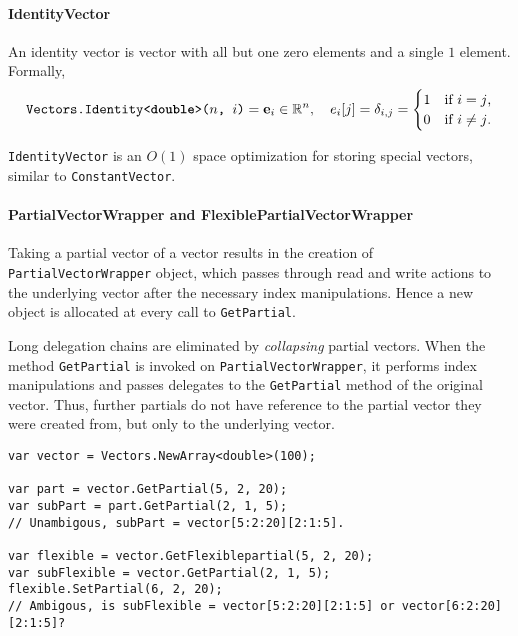 \paragraph{IdentityVector}

An identity vector is vector with all but one zero elements and a
single $1$ element. Formally,
\begin{equation}
  \texttt{Vectors.Identity<\textbf{double}>($n$, $i$)} = \bm{\mathrm{e}}_i \in
  \mathbb{R}^n, \quad e_i[j] = \delta_{i, j} = \begin{cases}
    1 & \text{if $i = j$,} \\
    0 & \text{if $i \ne j$.}
  \end{cases}
\end{equation}

\texttt{IdentityVector} is an $O(1)$ space optimization for storing
special vectors, similar to \texttt{ConstantVector}.

\paragraph{PartialVectorWrapper and FlexiblePartialVectorWrapper}

Taking a partial vector of a vector results in the creation of
\texttt{PartialVectorWrapper} object, which passes through read and
write actions to the underlying vector after the necessary index
manipulations. Hence a new object is allocated at every call to
\texttt{GetPartial}.

Long delegation chains are eliminated by \emph{collapsing} partial
vectors. When the method \texttt{GetPartial} is invoked on
\texttt{PartialVectorWrapper}, it performs index manipulations and
passes delegates to the \texttt{GetPartial} method of the original
vector. Thus, further partials do not have reference to the partial
vector they were created from, but only to the underlying vector.

\begin{lstlisting}[float,caption={Ambigous use of
    \texttt{FlexiblePartialVectorWrapper}.},label=lst:operations:ds:flexible-vector]
var vector = Vectors.NewArray<double>(100);

var part = vector.GetPartial(5, 2, 20);
var subPart = part.GetPartial(2, 1, 5);
// Unambigous, subPart = vector[5:2:20][2:1:5].

var flexible = vector.GetFlexiblepartial(5, 2, 20);
var subFlexible = vector.GetPartial(2, 1, 5);
flexible.SetPartial(6, 2, 20);
// Ambigous, is subFlexible = vector[5:2:20][2:1:5] or vector[6:2:20][2:1:5]?
\end{lstlisting}

